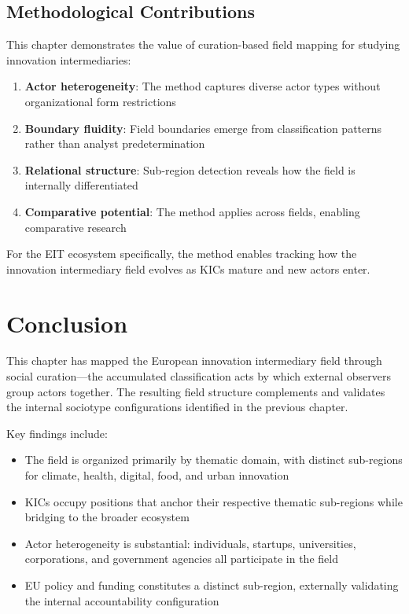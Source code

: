 \documentclass[../main.tex]{subfiles}
\begin{document}
\subsection{Methodological Contributions}

This chapter demonstrates the value of curation-based field mapping for studying innovation intermediaries:

\begin{enumerate}
    \item \textbf{Actor heterogeneity}: The method captures diverse actor types without organizational form restrictions
    \item \textbf{Boundary fluidity}: Field boundaries emerge from classification patterns rather than analyst predetermination
    \item \textbf{Relational structure}: Sub-region detection reveals how the field is internally differentiated
    \item \textbf{Comparative potential}: The method applies across fields, enabling comparative research
\end{enumerate}

For the EIT ecosystem specifically, the method enables tracking how the innovation intermediary field evolves as KICs mature and new actors enter.


\section{Conclusion}

This chapter has mapped the European innovation intermediary field through social curation---the accumulated classification acts by which external observers group actors together. The resulting field structure complements and validates the internal sociotype configurations identified in the previous chapter.

Key findings include:

\begin{itemize}
    \item The field is organized primarily by thematic domain, with distinct sub-regions for climate, health, digital, food, and urban innovation
    \item KICs occupy positions that anchor their respective thematic sub-regions while bridging to the broader ecosystem
    \item Actor heterogeneity is substantial: individuals, startups, universities, corporations, and government agencies all participate in the field
    \item EU policy and funding constitutes a distinct sub-region, externally validating the internal accountability configuration
\end{itemize}
\end{document}
